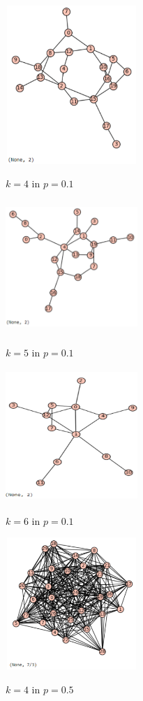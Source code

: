 \documentclass[a4paper]{article}
\begin{document}
\begin{figure}[h!]
    \caption*{$k=4$ in $p=0.1$}
    \centering
    \includegraphics[width=5cm, height=6cm]{Slika17}
    \label{fig:mesh1}
\end{figure}

\begin{figure}[h!]
    \caption*{$k=5$ in $p=0.1$}
    \centering
    \includegraphics[width=5cm, height=5cm]{Slika6}
    \label{fig:mesh1}
\end{figure}

\begin{figure}[h!]
    \caption*{$k=6$ in $p=0.1$}
    \centering
    \includegraphics[width=5cm, height=5cm]{Slika7}
    \label{fig:mesh1}
\end{figure}

\begin{figure}[h!]
    \caption*{$k=4$ in $p=0.5$}
    \centering
    \includegraphics[width=5cm, height=5cm]{Slika12}
    \label{fig:mesh1}
\end{figure}
\end{document}
